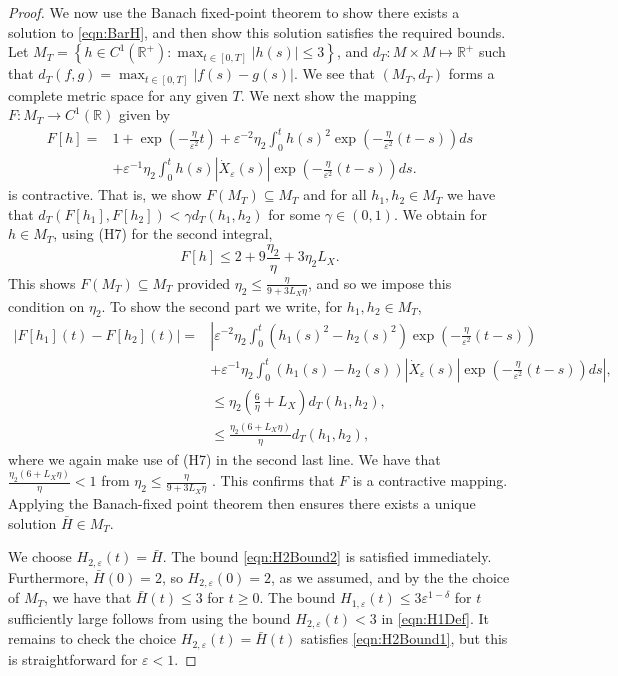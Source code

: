 \documentclass[]{article}
\theoremstyle{remark}
\begin{document}
\begin{proof}
We now use the Banach fixed-point theorem to show there exists a solution to \eqref{eqn:BarH}, and then show this solution satisfies the required bounds. Let $M_T=\left\{h\in{}C^{1}(\mathbb{R}^{+}): \max_{t\in[0,T]}|h(s)|\leq{3}\right\}$, and $d_T:M\times{M} \mapsto \mathbb{R}^{+}$ such that $d_T(f,g)=\max_{t\in[0,T]}|f(s)-g(s)|$. We see that $(M_T,d_T)$ forms a complete metric space for any given $T$. We next show the mapping $F: M_T \to C^1(\mathbb{R})$ given by
\begin{align*}
F[h]=&1+\exp\left(-\frac{\eta}{\varepsilon^2}t\right)+\varepsilon^{-2}\eta_2\int_{0}^{t}h(s)^2\exp\left(-\frac{\eta}{\varepsilon^2}(t-s)\right)ds\\
&+\varepsilon^{-1}\eta_2\int_{0}^{t}h(s)|\dot{X}_{\varepsilon}(s)|\exp\left(-\frac{\eta}{\varepsilon^2}(t-s)\right)ds.\nonumber
\end{align*}
 is contractive. That is, we show $F(M_T)\subseteq{}M_T$ and for all $h_1,h_2\in{}M_T$ we have that $d_T(F[h_1],F[h_2])<\gamma{}d_T(h_1,h_2)$ for some $\gamma\in(0,1)$. We obtain for $h\in{}M_T$, using (H7) for the second integral,
 \[F[h]\leq{}2+9\frac{\eta_2}{\eta}+3\eta_2L_X.\]
 This shows $F(M_T)\subseteq{}M_T$ provided $\eta_2\leq{}\frac{\eta}{9+3L_X\eta}$, and so we impose this condition on $\eta_2$. To show the second part
 we write, for $h_1,h_2\in{}M_T$,
\begin{align*}
    |F[h_1](t)-F[h_2](t)|=&\left\vert\varepsilon^{-2}\eta_2\int_{0}^{t}(h_1(s)^2-h_2(s)^2)\exp\left(-\frac{\eta}{\varepsilon^2}(t-s)\right)\right.\\
&\left.+\varepsilon^{-1}\eta_2\int_{0}^{t}(h_1(s)-h_2(s))|\dot{X}_{\varepsilon}(s)|\exp\left(-\frac{\eta}{\varepsilon^2}(t-s)\right)ds\right\vert,\\
    &\leq{}\eta_2\left(\frac{6}{\eta}+L_X\right)d_T(h_1,h_2),\\
    &\leq{}\frac{\eta_2(6+L_X\eta)}{\eta}d_T(h_1,h_2),
\end{align*}
where we again make use of (H7) in the second last line. We have that $\frac{\eta_2(6+L_X\eta)}{\eta}<1$ from $\eta_2\leq{}\frac{\eta}{9+3L_X\eta}$ . This confirms that $F$ is a contractive mapping. Applying the Banach-fixed point theorem then ensures there exists a unique solution $\bar{H}\in{}M_T$.


We choose $H_{2,\varepsilon}(t)=\bar{H}$. The bound \eqref{eqn:H2Bound2} is satisfied immediately. Furthermore, $\bar{H}(0)=2$, so $H_{2,\varepsilon}(0)=2$, as we assumed, and by the the choice of $M_T$, we have that $\bar{H}(t)\leq{3}$  for $t\geq{0}$. The bound  $H_{1,\varepsilon}(t)\leq{}3\varepsilon^{1-\delta}$ for $t$ sufficiently large follows from using the bound $H_{2,\varepsilon}(t)<3$ in \eqref{eqn:H1Def}. It remains to check the choice $H_{2,\varepsilon}(t)=\bar{H}(t)$ satisfies \eqref{eqn:H2Bound1}, but this is straightforward for $\varepsilon<1$.





\end{proof}
\end{document}
